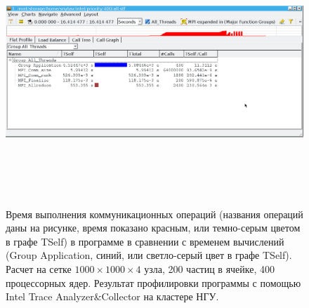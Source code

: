 	   
\begin{figure}[h]
	\begin{center}
		\includegraphics[height=10cm,keepaspectratio]{images/scalingNSU-img20.png}
		\caption{
			Время выполнения коммуникационных операций (названия операций даны на рисунке, время показано красным, или темно-серым цветом в графе TSelf) в программе в сравнении с временем вычислений (Group Application, синий, или светло-серый цвет в графе TSelf). Расчет на сетке $1000  \times 1000 \times 4$ узла, 200 частиц в ячейке, 400 процессорных ядер. Результат профилировки программы с помощью Intel Trace Analyzer\&Collector на кластере НГУ.
		}
		\label{scale9a}
	\end{center} 
\end{figure}	    
	    
	    
	   

